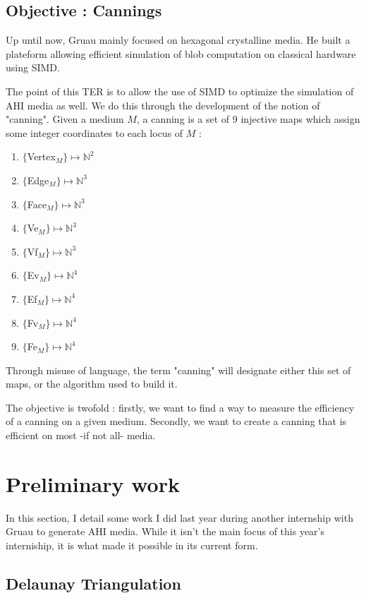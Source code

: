 \documentclass{article}
\begin{document}
\subsection{Objective : Cannings}

Up until now, Gruau mainly focused on hexagonal crystalline media. He built a plateform allowing efficient simulation of blob computation on classical hardware using SIMD\cite{Voronoi}\cite{platform_CA2}. 

The point of this TER is to allow the use of SIMD to optimize the simulation of AHI media as well. We do this through the development of the notion of "canning". Given a medium $M$, a canning is a set of 9 injective maps which assign some integer coordinates to each locus of $M$ :
\begin{enumerate}
	\item $\{$Vertex$_M\} \mapsto \mathbb{N}^2$
	\item $\{$Edge$_M\} \mapsto \mathbb{N}^3$
	\item $\{$Face$_M\} \mapsto \mathbb{N}^3$
	\item $\{$Ve$_M\} \mapsto \mathbb{N}^3$
	\item $\{$Vf$_M\} \mapsto \mathbb{N}^3$
	\item $\{$Ev$_M\} \mapsto \mathbb{N}^4$
	\item $\{$Ef$_M\} \mapsto \mathbb{N}^4$
	\item $\{$Fv$_M\} \mapsto \mathbb{N}^4$
	\item $\{$Fe$_M\} \mapsto \mathbb{N}^4$
\end{enumerate}
Through misuse of language, the term "canning" will designate either this set of maps, or the algorithm used to build it.

The objective is twofold : firstly, we want to find a way to measure the efficiency of a canning on a given medium. Secondly, we want to create a canning that is efficient on most -if not all- media.

\section{Preliminary work}

In this section, I detail some work I did last year during another internship with Gruau to generate AHI media. While it isn't the main focus of this year's interniship, it is what made it possible in its current form.

\subsection{Delaunay Triangulation}
\end{document}
